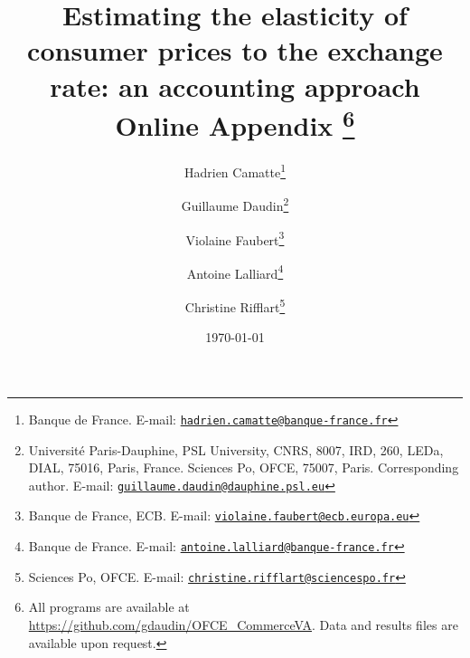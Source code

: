 \documentclass[12pt,a4paper]{article}
\newcommand{\email}[1]{\href{mailto:#1}{\nolinkurl{#1}}}
\begin{document}
\title{Estimating the elasticity of consumer prices to the exchange rate: an accounting approach \\ Online Appendix	\thanks{ All programs are available at \url{https://github.com/gdaudin/OFCE_CommerceVA}. Data and results files are available upon request.}\\
\vspace{1cm}
}
\vspace{1cm}
\date{\today}
\author{
	Hadrien Camatte\thanks{Banque de France. E-mail: \email{hadrien.camatte@banque-france.fr}}
	\and
	Guillaume Daudin\thanks{Université Paris-Dauphine, PSL University, CNRS, 8007, IRD, 260, LEDa, DIAL, 75016, Paris, France. Sciences Po, OFCE, 75007, Paris. Corresponding author. E-mail: \email{guillaume.daudin@dauphine.psl.eu}}
	\and
	Violaine Faubert\thanks{Banque de France, ECB. E-mail: \email{violaine.faubert@ecb.europa.eu}}
	\and
	Antoine Lalliard\thanks{Banque de France. E-mail: \email{antoine.lalliard@banque-france.fr}}
	\and
	Christine Rifflart\thanks{Sciences Po, OFCE. E-mail: \email{christine.rifflart@sciencespo.fr}}
}
\maketitle
\end{document}
